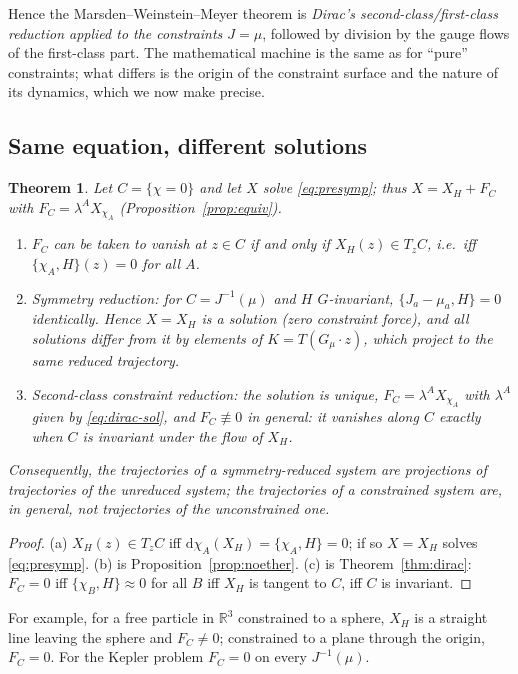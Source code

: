 \documentclass[11pt,a4paper]{article}
\numberwithin{equation}{section}
\theoremstyle{plain}
\newtheorem{theorem}{Theorem}[section]
\theoremstyle{definition}
\theoremstyle{remark}
\newcommand{\R}{\mathbb{R}}
\newcommand{\pb}[2]{\{#1,#2\}}
\newcommand{\weq}{\mathrel{\approx}}
\newcommand{\dd}{\mathrm{d}}
\begin{document}
Hence the Marsden--Weinstein--Meyer theorem is \emph{Dirac's second-class/first-class reduction applied to the constraints $J=\mu$}, followed by division by the gauge flows of the first-class part. The mathematical machine is the same as for ``pure'' constraints; what differs is the origin of the constraint surface and the nature of its dynamics, which we now make precise.

\subsection{Same equation, different solutions}

\begin{theorem}\label{thm:samesolve}
Let $C=\{\chi=0\}$ and let $X$ solve \eqref{eq:presymp}; thus $X=X_H+F_C$ with $F_C=\lambda^AX_{\chi_A}$ (Proposition~\ref{prop:equiv}).
\begin{enumerate}[label=(\alph*)]
\item $F_C$ can be taken to vanish at $z\in C$ if and only if $X_H(z)\in T_zC$, i.e.\ iff $\pb{\chi_A}{H}(z)=0$ for all $A$.
\item \emph{Symmetry reduction:} for $C=J^{-1}(\mu)$ and $H$ $G$-invariant, $\pb{J_a-\mu_a}{H}=0$ \emph{identically}. Hence $X=X_H$ is a solution (zero constraint force), and all solutions differ from it by elements of $K=T(G_\mu\cdot z)$, which project to the same reduced trajectory.
\item \emph{Second-class constraint reduction:} the solution is unique, $F_C=\lambda^AX_{\chi_A}$ with $\lambda^A$ given by \eqref{eq:dirac-sol}, and $F_C\not\equiv0$ in general: it vanishes along $C$ exactly when $C$ is invariant under the flow of $X_H$.
\end{enumerate}
Consequently, the trajectories of a symmetry-reduced system are projections of trajectories of the \emph{unreduced} system; the trajectories of a constrained system are, in general, not trajectories of the unconstrained one.
\end{theorem}
\begin{proof}
(a) $X_H(z)\in T_zC$ iff $\dd\chi_A(X_H)=\pb{\chi_A}{H}=0$; if so $X=X_H$ solves \eqref{eq:presymp}. (b) is Proposition~\ref{prop:noether}. (c) is Theorem~\ref{thm:dirac}: $F_C=0$ iff $\pb{\chi_B}{H}\weq0$ for all $B$ iff $X_H$ is tangent to $C$, iff $C$ is invariant.
\end{proof}

For example, for a free particle in $\R^3$ constrained to a sphere, $X_H$ is a straight line leaving the sphere and $F_C\ne0$; constrained to a plane through the origin, $F_C=0$. For the Kepler problem $F_C=0$ on every $J^{-1}(\mu)$.
\end{document}

